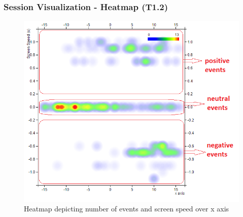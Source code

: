 \documentclass{beamer}
\begin{document}
\begin{frame}
\frametitle{Session Visualization - Heatmap (T1.2)}
\begin{figure}
\includegraphics[scale=0.4]{images/heatmap3.png}
\caption{Heatmap depicting number of events and screen speed over x axis}
\end{figure}
\end{frame}
\end{document}
